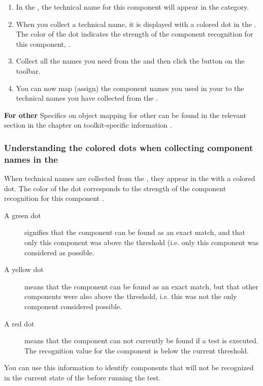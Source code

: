\begin{enumerate}
\item In the \gdomeditor{}, the technical name for this component will appear in the  category. 
\item When you collect a technical name, it is displayed with a colored dot in the \gdomeditor{}. The color of the dot indicates the strength of the component recognition for this component,  .
\item Collect all the names you need from the \gdaut{} and then click the  button on the toolbar. 
\item You can now map (assign) the component names you used in your \gdcases{} to the technical names you have collected from the \gdaut{} .
\end{enumerate}

\textbf{For other \gdauts{}}
Specifics on object mapping for other \gdauts{} can be found in the relevant section in the chapter on toolkit-specific information . 

\subsubsection{Understanding the colored dots when collecting component names in the \gdomeditor{}}
\label{TasksOMStateColor}

When technical names are collected from the \gdaut{}, they appear in the \gdomeditor{} with a colored dot. The color of the dot corresponds to the strength of the component recognition for this component . 

\begin{description}
\item [A green dot]{signifies that the component can be found as an exact match, and that only this component was above the threshold  (i.e. only this component was considered as possible.}
\item [A yellow dot]{means that the component can be found as an exact match, but that other components were also above the threshold, i.e. this was not the only component considered possible.}
\item [A red dot]{means that the component can not currently be found if a test is executed. The recognition value for the component is below the current threshold.}
\end{description}

You can use this information to identify components that will not be recognized in the current state of the \gdaut{} before running the test. 

